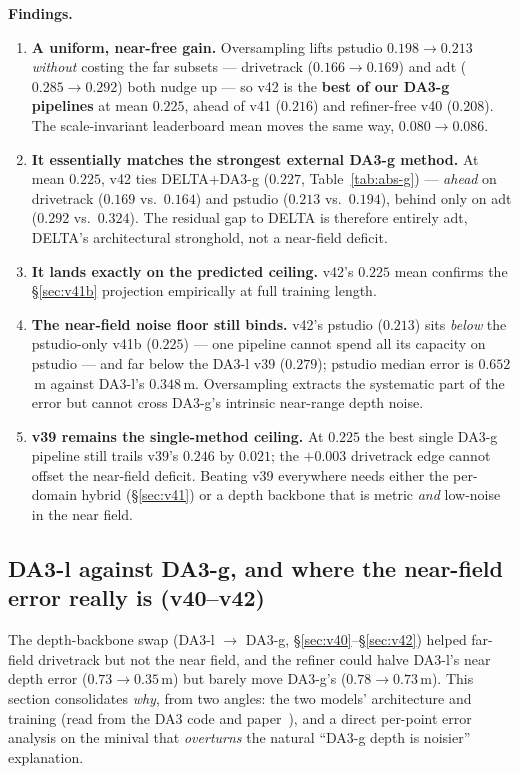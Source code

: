 \documentclass[11pt,a4paper]{article}
\begin{document}
\textbf{Findings.}
\begin{enumerate}
  \item \textbf{A uniform, near-free gain.} Oversampling lifts pstudio $0.198\!\to\!0.213$ \emph{without}
  costing the far subsets --- drivetrack ($0.166\!\to\!0.169$) and adt ($0.285\!\to\!0.292$) both nudge up ---
  so v42 is the \textbf{best of our DA3-g pipelines} at mean $0.225$, ahead of v41 ($0.216$) and
  refiner-free v40 ($0.208$). The scale-invariant leaderboard mean moves the same way, $0.080\!\to\!0.086$.
  \item \textbf{It essentially matches the strongest external DA3-g method.} At mean $0.225$, v42 ties
  DELTA$+$DA3-g ($0.227$, Table~\ref{tab:abs-g}) --- \emph{ahead} on drivetrack ($0.169$ vs.\ $0.164$) and
  pstudio ($0.213$ vs.\ $0.194$), behind only on adt ($0.292$ vs.\ $0.324$). The residual gap to DELTA is
  therefore entirely adt, DELTA's architectural stronghold, not a near-field deficit.
  \item \textbf{It lands exactly on the predicted ceiling.} v42's $0.225$ mean confirms the
  \S\ref{sec:v41b} projection empirically at full training length.
  \item \textbf{The near-field noise floor still binds.} v42's pstudio ($0.213$) sits \emph{below} the
  pstudio-only v41b ($0.225$) --- one pipeline cannot spend all its capacity on pstudio --- and far below the
  DA3-l v39 ($0.279$); pstudio median error is $0.652$\,m against DA3-l's $0.348$\,m. Oversampling extracts
  the systematic part of the error but cannot cross DA3-g's intrinsic near-range depth noise.
  \item \textbf{v39 remains the single-method ceiling.} At $0.225$ the best single DA3-g pipeline still
  trails v39's $0.246$ by $0.021$; the $+0.003$ drivetrack edge cannot offset the near-field deficit.
  Beating v39 everywhere needs either the per-domain hybrid (\S\ref{sec:v41}) or a depth backbone that is
  metric \emph{and} low-noise in the near field.
\end{enumerate}

\subsection{DA3-l against DA3-g, and where the near-field error really is (v40--v42)}
\label{sec:da3lg}
The depth-backbone swap (DA3-l $\to$ DA3-g, \S\ref{sec:v40}--\S\ref{sec:v42}) helped far-field drivetrack but
not the near field, and the refiner could halve DA3-l's near depth error ($0.73\!\to\!0.35$\,m) but barely
move DA3-g's ($0.78\!\to\!0.73$\,m). This section consolidates \emph{why}, from two angles: the two models'
architecture and training (read from the DA3 code and paper~\cite{da3}), and a direct per-point error
analysis on the minival that \emph{overturns} the natural ``DA3-g depth is noisier'' explanation.
\end{document}
